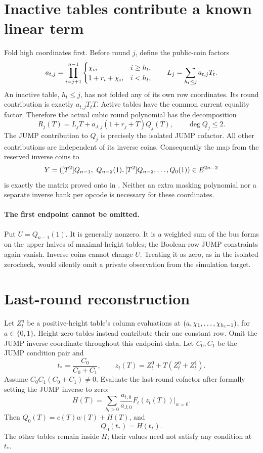 \documentclass[11pt]{article}
\begin{document}
\section{Inactive tables contribute a known linear term}

Fold high coordinates first. Before round $j$, define the public-coin factors
\[
 a_{t,j}=\prod_{i=j+1}^{n-1}
 \begin{cases}
 \chi_i,&i\ge h_t,\\
 1+r_i+\chi_i,&i<h_t,
 \end{cases}
 \qquad
 L_j=\sum_{h_t\le j}a_{t,j}T_t.
\]
An inactive table, $h_t\le j$, has not folded any of its own row coordinates. Its round contribution is exactly $a_{t,j}T_t T$. Active tables have the common current equality factor. Therefore the actual cubic round polynomial has the decomposition
\begin{equation}\label{eq:batch-round}
 R_j(T)=L_jT+a_{J,j}(1+r_j+T)Q_j(T),\qquad\deg Q_j\le2.
\end{equation}
The JUMP contribution to $Q_j$ is precisely the isolated JUMP cofactor. All other contributions are independent of its inverse coins. Consequently the map from the reserved inverse coins to
\[
 Y=( [T^2]Q_{n-1},\ Q_{n-2}(1),[T^2]Q_{n-2},\ldots,Q_0(1))
 \in\E^{2n-2}
\]
is exactly the matrix proved onto in . Neither an extra masking polynomial nor a separate inverse bank per opcode is necessary for these coordinates.

\paragraph{The first endpoint cannot be omitted.} Put $U=Q_{n-1}(1)$. It is generally nonzero. It is a weighted sum of the bus forms on the upper halves of maximal-height tables; the Boolean-row JUMP constraints again vanish. Inverse coins cannot change $U$. Treating it as zero, as in the isolated zerocheck, would silently omit a private observation from the simulation target.

\section{Last-round reconstruction}

Let $Z_t^a$ be a positive-height table's column evaluations at $(a,\chi_1,\ldots,\chi_{h_t-1})$, for $a\in\{0,1\}$. Height-zero tables instead contribute their one constant row. Omit the JUMP inverse coordinate throughout this endpoint data. Let $C_0,C_1$ be the JUMP condition pair and
\[
 t_* = \frac{C_0}{C_0+C_1},\qquad
 z_t(T)=Z_t^0+T(Z_t^0+Z_t^1).
\]
Assume $C_0C_1(C_0+C_1)\ne0$. Evaluate the last-round cofactor after formally setting the JUMP inverse to zero:
\[
 H(T)=\sum_{h_t>0}\frac{a_{t,0}}{a_{J,0}}
 F_t(z_t(T))\big|_{w=0}.
\]
Then $Q_0(T)=c(T)w(T)+H(T)$, and
\begin{equation}\label{eq:batch-root}
 Q_0(t_*)=H(t_*).
\end{equation}
The other tables remain inside $H$; their values need not satisfy any condition at $t_*$.
\end{document}
